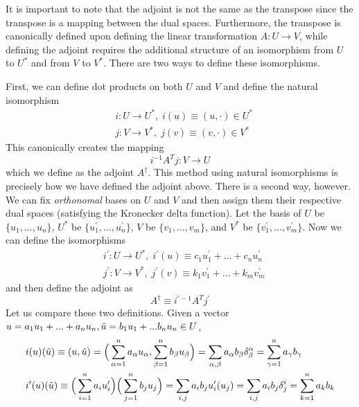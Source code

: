 \documentclass{article}
\theoremstyle{remark}
\theoremstyle{definition}
\begin{document}
    It is important to note that the adjoint is not the same as the transpose since the transpose is a mapping between the dual spaces. Furthermore, the transpose is canonically defined upon defining the linear transformation $A: U \longrightarrow V$, while defining the adjoint requires the additional structure of an isomorphism from $U$ to $U^*$ and from $V$ to $V^*$. There are two ways to define these isomorphisms. 

    First, we can define dot products on both $U$ and $V$ and define the natural isomorphism 
    \begin{align*}
        &i: U \longrightarrow U^*, \; i(u) \equiv (u, \cdot) \in U^*\\
        &j: V \longrightarrow V^*, \; j(v) \equiv (v, \cdot) \in V^*
    \end{align*}
    This canonically creates the mapping 
    \[i^{-1} A^T j: V \longrightarrow U\]
    which we define as the adjoint $A^\dagger$. This method using natural isomorphisms is precisely how we have defined the adjoint above. There is a second way, however. We can fix \textit{orthonomal} bases on $U$ and $V$ and then assign them their respective dual spaces (satisfying the Kronecker delta function). Let the basis of $U$ be $\{u_1, ..., u_n\}$, $U^*$ be $\{u_1^\prime, ..., u_n^\prime\}$, $V$ be $\{v_1, ..., v_m\}$, and $V^*$ be $\{v_1^\prime, ..., v_m^\prime\}$. Now we can define the isomorphisms 
    \begin{align*}
        & i^\prime: U \longrightarrow U^*, \; i^\prime (u) \equiv c_1 u_1^\prime + ... + c_n u_n^\prime \\
        & j^\prime: V \longrightarrow V^*, \; j^\prime (v) \equiv k_1 v_1^\prime + ... + k_m v_m^\prime
    \end{align*}
    and then define the adjoint as 
    \[A^\dagger \equiv i^{\prime -1} A^T j^\prime\]
    Let us compare these two definitions. Given a vector $u = a_1 u_1 + ... + a_n u_n, \Tilde{u} = b_1 u_1 + ... b_n u_n \in U$, 
    \begin{align*}
        &i(u)(\Tilde{u}) \equiv (u, \Tilde{u}) = \Big(\sum_{\alpha = 1}^n a_\alpha u_\alpha, \sum_{\beta = 1}^n b_\beta u_\beta \Big) = \sum_{\alpha, \beta} a_\alpha b_\beta \delta^\alpha_\beta = \sum_{\gamma=1}^n a_\gamma b_\gamma \\
        &i^\prime(u)(\Tilde{u}) \equiv \Big(\sum_{i=1}^n a_i u_i^\prime \Big) \Big( \sum_{j=1}^n b_j u_j \Big) = \sum_{i, j} a_i b_j u_i^\prime (u_j) = \sum_{i, j} a_i b_j \delta^i_j = \sum_{k=1}^n a_k b_k
    \end{align*}
\end{document}
